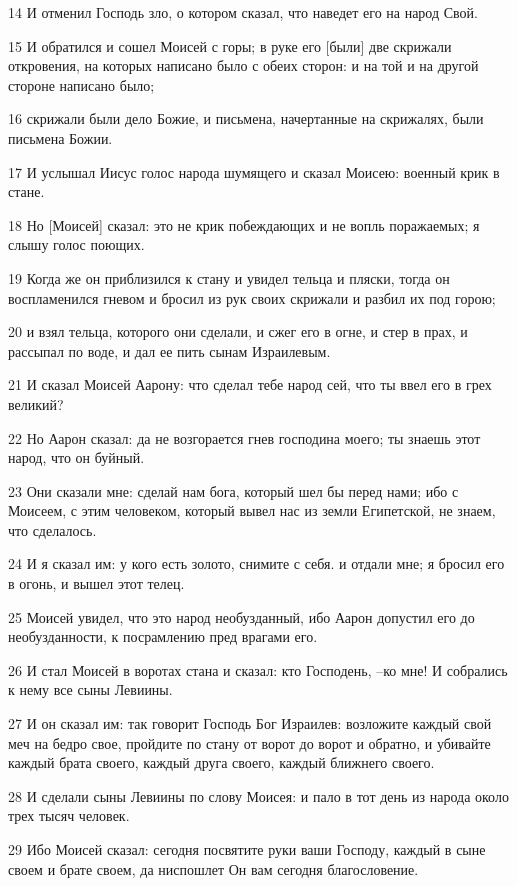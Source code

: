 \par 14 И отменил Господь зло, о котором сказал, что наведет его на народ Свой.
\par 15 И обратился и сошел Моисей с горы; в руке его [были] две скрижали откровения, на которых написано было с обеих сторон: и на той и на другой стороне написано было;
\par 16 скрижали были дело Божие, и письмена, начертанные на скрижалях, были письмена Божии.
\par 17 И услышал Иисус голос народа шумящего и сказал Моисею: военный крик в стане.
\par 18 Но [Моисей] сказал: это не крик побеждающих и не вопль поражаемых; я слышу голос поющих.
\par 19 Когда же он приблизился к стану и увидел тельца и пляски, тогда он воспламенился гневом и бросил из рук своих скрижали и разбил их под горою;
\par 20 и взял тельца, которого они сделали, и сжег его в огне, и стер в прах, и рассыпал по воде, и дал ее пить сынам Израилевым.
\par 21 И сказал Моисей Аарону: что сделал тебе народ сей, что ты ввел его в грех великий?
\par 22 Но Аарон сказал: да не возгорается гнев господина моего; ты знаешь этот народ, что он буйный.
\par 23 Они сказали мне: сделай нам бога, который шел бы перед нами; ибо с Моисеем, с этим человеком, который вывел нас из земли Египетской, не знаем, что сделалось.
\par 24 И я сказал им: у кого есть золото, снимите с себя. и отдали мне; я бросил его в огонь, и вышел этот телец.
\par 25 Моисей увидел, что это народ необузданный, ибо Аарон допустил его до необузданности, к посрамлению пред врагами его.
\par 26 И стал Моисей в воротах стана и сказал: кто Господень, --ко мне! И собрались к нему все сыны Левиины.
\par 27 И он сказал им: так говорит Господь Бог Израилев: возложите каждый свой меч на бедро свое, пройдите по стану от ворот до ворот и обратно, и убивайте каждый брата своего, каждый друга своего, каждый ближнего своего.
\par 28 И сделали сыны Левиины по слову Моисея: и пало в тот день из народа около трех тысяч человек.
\par 29 Ибо Моисей сказал: сегодня посвятите руки ваши Господу, каждый в сыне своем и брате своем, да ниспошлет Он вам сегодня благословение.
